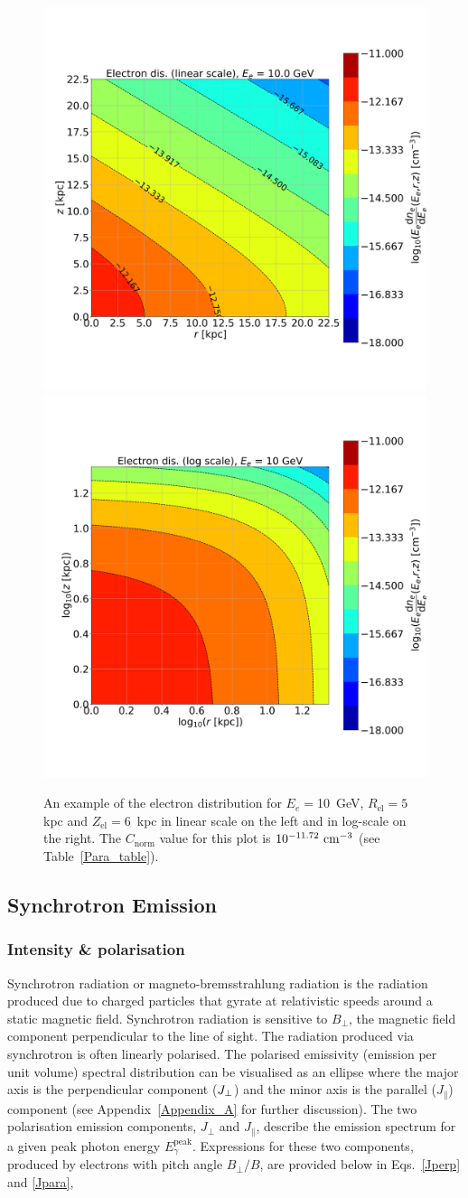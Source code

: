 \documentclass[usenatbib]{mnras}
\begin{document}
\begin{figure}
\centering
\includegraphics[width=0.49\linewidth]{Images/Linear_EdNdE.png}%
\includegraphics[width = 0.49\linewidth]{Images/Log_EdNdE.png}
\caption{An example of the electron distribution for $E_e = $10~GeV, $R_{\mathrm{el}} = 5$ kpc and $Z_{\mathrm{el}} = 6$~kpc in linear scale on the left and in log-scale on the right. The $C_\mathrm{norm}$ value for this plot is $10^{-11.72}~{\rm cm}^{-3}$ (see Table~\ref{Para_table}).}  
\label{fig:electron_density}
\end{figure}
\subsection{Synchrotron Emission}\label{Synchrotron_theory}

\subsubsection{Intensity \& polarisation}
Synchrotron radiation or magneto-bremsstrahlung radiation is the radiation produced due to charged particles that gyrate at relativistic speeds around a static magnetic field. Synchrotron radiation is sensitive to $B_{\perp}$, the magnetic field component perpendicular to the line of sight. The radiation produced via synchrotron is often linearly polarised.
The polarised emissivity (emission per unit volume) spectral distribution can be visualised as an ellipse where the major axis is the perpendicular component ($J_{\rm \perp}$) and the minor axis is the parallel ($J_{\parallel}$) component (see Appendix~\ref{Appendix_A} for further discussion). 
The two polarisation emission components, $J_{\perp}$ and $J_{\parallel}$, describe the emission spectrum for a given peak photon energy $E_{\gamma}^{\mathrm{peak}}$.
Expressions for these two components, produced by electrons with pitch angle $B_{\perp}/B$, are provided below in Eqs.~\ref{Jperp} and \ref{Jpara},
\end{document}
